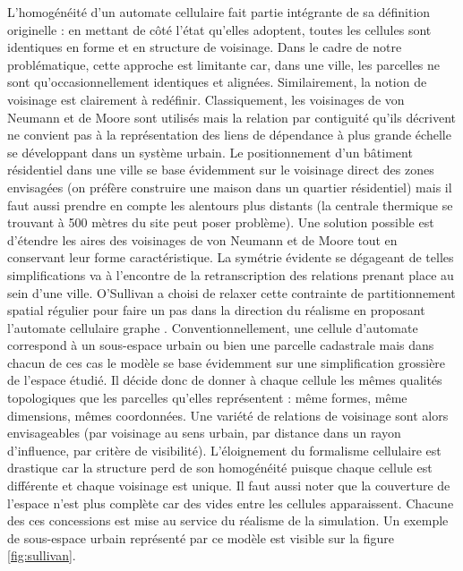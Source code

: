 \documentclass[10pt]{article}
\begin{document}
L'homogénéité d'un automate cellulaire fait partie intégrante de sa
définition originelle : en mettant de côté l'état qu'elles adoptent,
toutes les cellules sont identiques en forme et en structure de
voisinage. Dans le cadre de notre problématique, cette approche est
limitante car, dans une ville, les parcelles ne sont
qu'occasionnellement identiques et alignées. Similairement, la notion
de voisinage est clairement à redéfinir. Classiquement, les voisinages
de von Neumann et de Moore sont utilisés mais la relation par
contiguité qu'ils décrivent ne convient pas à la représentation des
liens de dépendance à plus grande échelle se développant dans un
système urbain. Le positionnement d'un bâtiment résidentiel dans une
ville se base évidemment sur le voisinage direct des zones envisagées
(on préfère construire une maison dans un quartier résidentiel) mais
il faut aussi prendre en compte les alentours plus distants (la
centrale thermique se trouvant à 500 mètres du site peut poser
problème). Une solution possible est d'étendre les aires des
voisinages de von Neumann et de Moore tout en conservant leur forme
caractéristique. La symétrie évidente se dégageant de telles
simplifications va à l'encontre de la retranscription des relations
prenant place au sein d'une ville. O'Sullivan a choisi de relaxer
cette contrainte de partitionnement spatial régulier pour faire un pas
dans la direction du réalisme en proposant l'automate cellulaire
graphe \cite{O'Sullivan2000,O'Sullivan2001}. Conventionnellement, une
cellule d'automate correspond à un sous-espace urbain ou bien une
parcelle cadastrale mais dans chacun de ces cas le modèle se base
évidemment sur une simplification grossière de l'espace étudié. Il
décide donc de donner à chaque cellule les mêmes qualités topologiques
que les parcelles qu'elles représentent : même formes, même
dimensions, mêmes coordonnées. Une variété de relations de voisinage
sont alors envisageables (par voisinage au sens urbain, par distance
dans un rayon d'influence, par critère de visibilité). L'éloignement
du formalisme cellulaire est drastique car la structure perd de son
homogénéité puisque chaque cellule est différente et chaque voisinage
est unique. Il faut aussi noter que la couverture de l'espace n'est
plus complète car des vides entre les cellules apparaissent. Chacune
des ces concessions est mise au service du réalisme de la
simulation. Un exemple de sous-espace urbain représenté par ce modèle
est visible sur la figure \ref{fig:sullivan}.
\end{document}
